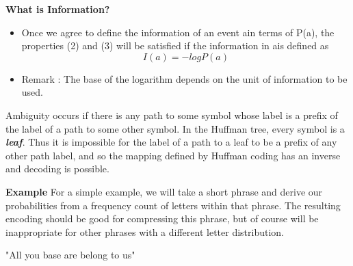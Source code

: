 {
\noindent \textbf{What is Information?}
\begin{itemize} \item Once we agree to define the information of an event ain terms of P(a), the properties (2) and (3) will be satisfied if the information in ais defined as
\[ I(a) = -log P(a)\]

\item Remark : The base of the logarithm depends on the unit of information to be used.
\end{itemize}
}



{
Ambiguity occurs if there is any path to some symbol whose label is a prefix of the label of a path to some other symbol. In the Huffman tree, every symbol is a \textbf{\emph{leaf}}. Thus it is impossible for the label of a path to a leaf to be a prefix of any other path label, and so the mapping defined by Huffman coding has an inverse and decoding is possible.
}
{
\noindent \textbf{Example}
For a simple example, we will take a short phrase and derive our probabilities from a frequency count of letters within that phrase. The resulting encoding should be good for compressing this phrase, but of course will be inappropriate for other phrases with a different letter distribution.

"All you base are belong to us"
}
